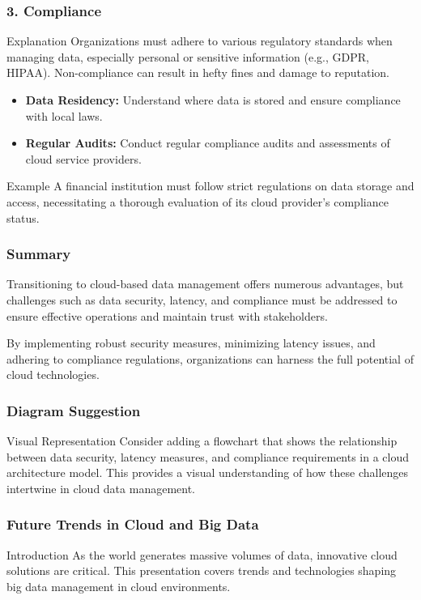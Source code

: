 \documentclass[aspectratio=169]{beamer}
\begin{document}
\begin{frame}[fragile]
    \frametitle{3. Compliance}
    \begin{block}{Explanation}
        Organizations must adhere to various regulatory standards when managing data, especially personal or sensitive information (e.g., GDPR, HIPAA). Non-compliance can result in hefty fines and damage to reputation.
    \end{block}

    \begin{itemize}
        \item \textbf{Data Residency:} Understand where data is stored and ensure compliance with local laws.
        \item \textbf{Regular Audits:} Conduct regular compliance audits and assessments of cloud service providers.
    \end{itemize}

    \begin{block}{Example}
        A financial institution must follow strict regulations on data storage and access, necessitating a thorough evaluation of its cloud provider’s compliance status.
    \end{block}
\end{frame}

\begin{frame}[fragile]
    \frametitle{Summary}
    Transitioning to cloud-based data management offers numerous advantages, but challenges such as data security, latency, and compliance must be addressed to ensure effective operations and maintain trust with stakeholders. 

    By implementing robust security measures, minimizing latency issues, and adhering to compliance regulations, organizations can harness the full potential of cloud technologies.
\end{frame}

\begin{frame}[fragile]
    \frametitle{Diagram Suggestion}
    \begin{block}{Visual Representation}
        Consider adding a flowchart that shows the relationship between data security, latency measures, and compliance requirements in a cloud architecture model. This provides a visual understanding of how these challenges intertwine in cloud data management.
    \end{block}
\end{frame}

\begin{frame}[fragile]
    \frametitle{Future Trends in Cloud and Big Data}
    \begin{block}{Introduction}
        As the world generates massive volumes of data, innovative cloud solutions are critical. This presentation covers trends and technologies shaping big data management in cloud environments.
    \end{block}
\end{frame}
\end{document}
